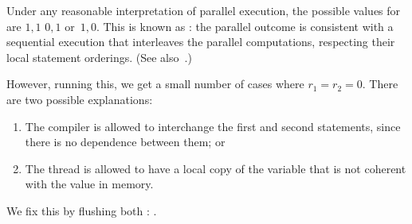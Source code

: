 Under any reasonable interpretation of parallel execution,
the possible values for  are $1,1$ $0,1$ or~$1,0$.
This is known as :
the parallel outcome is consistent with a sequential execution that
interleaves the parallel computations, respecting their local statement orderings.
(See also~.)

However, running this, we get a small number of cases where $r_1=r_2=0$.
There are two possible explanations:
\begin{enumerate}
\item The compiler is allowed to interchange the first and second statements,
  since there is no dependence between them; or
\item The thread is allowed to have a local copy of the variable
  that is not coherent with the value in memory.
\end{enumerate}

We fix this by flushing both :
.


